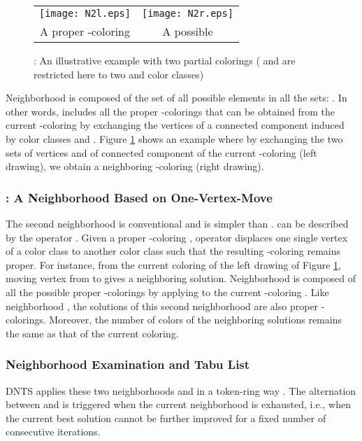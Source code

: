 \documentclass{elsart}
\begin{document}
\begin{figure}[h]
\begin{center}
\begin{tabular}{c@{\qquad\qquad}c}
\texttt{[image: N2l.eps]} & \texttt{[image: N2r.eps]}\\
A proper -coloring  & A possible 
\end{tabular}
\caption{: An illustrative example with two partial colorings ( and  are restricted here to two  and  color classes)}
\label{fig_chain_swap}
\end{center}
\end{figure}

Neighborhood  is composed of the set  of all possible elements in all the  sets: . In other words,  includes all the proper -colorings that can be obtained from the current -coloring  by exchanging the vertices of a connected component induced by color classes  and . Figure \ref{fig_chain_swap} shows an example where by exchanging the two sets of vertices  and  of connected component  of the current -coloring  (left drawing), we obtain a neighboring -coloring  (right drawing).


\subsubsection{: A Neighborhood Based on One-Vertex-Move}
\label{subsec_sol_one_move_tabu}

The second neighborhood  is conventional and is simpler than .  can be described by the operator . Given a proper -coloring , operator  displaces one single vertex  of a color class  to another color class  such that the resulting -coloring remains proper. For instance, from the current coloring  of the left drawing of Figure \ref{fig_chain_swap}, moving vertex  from  to  gives a neighboring solution. Neighborhood  is composed of all the possible proper -colorings by applying  to the current -coloring . Like neighborhood , the solutions of this second neighborhood are also proper -colorings. Moreover, the number of colors of the neighboring solutions remains the same as that of the current coloring.




\subsubsection{Neighborhood Examination and Tabu List}
\label{Neighborhood examination}

DNTS applies these two neighborhoods  and  in a token-ring way \cite{GasperoSchaerf2006,Luetal2011}. The alternation between  and  is triggered when the current neighborhood is exhausted, i.e., when the current best solution cannot be further improved for a fixed number of consecutive iterations.  
\end{document}
